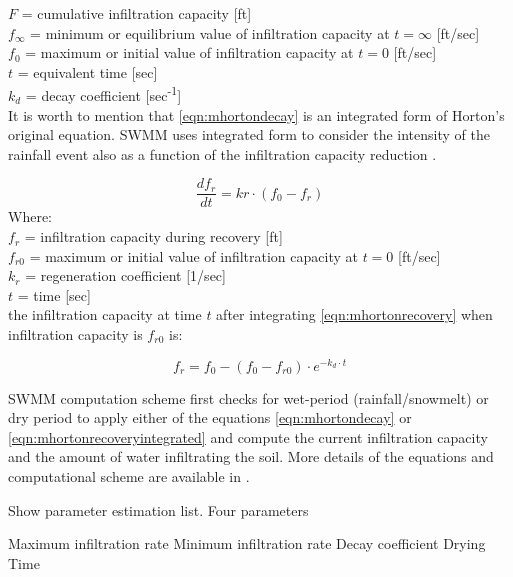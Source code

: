\indent $F$ = cumulative infiltration capacity [ft] \\
\indent $f_\infty$ = minimum or equilibrium value of infiltration capacity at $t = \infty$  [ft/sec] \\
\indent $f_0$ = maximum or initial value of infiltration capacity at $t = 0$ [ft/sec] \\
\indent $t$ = equivalent time [sec] \\
\indent $k_d$ = decay coefficient [sec\textsuperscript{-1}] \\

It is worth to mention that \ref{eqn:mhortondecay} is an integrated form of Horton's original equation. SWMM uses integrated form to consider the intensity of the rainfall event also as a function of the infiltration capacity reduction \cite{Rossman2016}. 


\begin{equation}
\label{eqn:mhortonrecovery}
\frac{df_r}{dt} = kr \cdot (f_0 - f_r) 
\end{equation}
Where: \\

\indent $f_r$ = infiltration capacity during recovery [ft] \\
\indent $f_{r0}$ = maximum or initial value of infiltration capacity at $t = 0$ [ft/sec] \\
\indent $k_r$ = regeneration coefficient [1/sec] \\
\indent $t$ = time [sec] \\

the infiltration capacity at time $t$ after integrating \ref{eqn:mhortonrecovery} when infiltration capacity is $f_{r0}$ is:

\begin{equation}
\label{eqn:mhortonrecoveryintegrated}
f_r =  f_0 - (f_0 - f_{r0}) \cdot e^{-k_d \cdot t}
\end{equation}
    




SWMM computation scheme first checks for wet-period (rainfall/snowmelt) or dry period to apply either of the equations \ref{eqn:mhortondecay} or \ref{eqn:mhortonrecoveryintegrated}  and compute the current infiltration capacity and the amount of water infiltrating the soil. More details of the equations and computational scheme are available in \citet{Rossman2016}.

Show parameter estimation list. Four parameters
 

Maximum infiltration rate
Minimum infiltration rate
Decay coefficient
Drying Time


